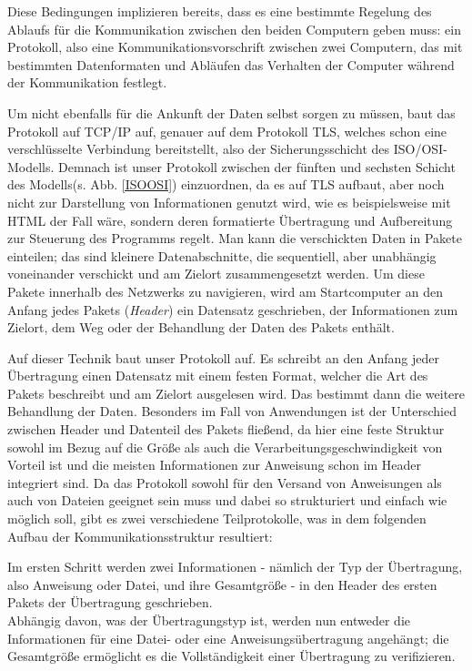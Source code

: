 Diese Bedingungen implizieren bereits, dass es eine bestimmte Regelung des Ablaufs für die Kommunikation zwischen den beiden Computern geben muss: ein Protokoll, also eine Kommunikationsvorschrift zwischen zwei Computern, das mit bestimmten Datenformaten und Abläufen das Verhalten der Computer während der Kommunikation festlegt.\par
Um nicht ebenfalls für die Ankunft der Daten selbst sorgen zu müssen, baut das Protokoll auf TCP/IP auf, genauer auf dem Protokoll TLS, welches schon eine verschlüsselte Verbindung bereitstellt, also der Sicherungsschicht des ISO/OSI-Modells. 
Demnach ist unser Protokoll zwischen der fünften und sechsten Schicht des Modells(s. Abb. \ref{ISOOSI}) einzuordnen, da es auf TLS aufbaut, aber noch nicht zur Darstellung von Informationen genutzt wird, wie es beispielsweise mit HTML der Fall wäre, sondern deren formatierte Übertragung und Aufbereitung zur Steuerung des Programms regelt.
Man kann die verschickten Daten in Pakete einteilen; das sind kleinere Datenabschnitte, die sequentiell, aber unabhängig voneinander verschickt und am Zielort zusammengesetzt werden.
Um diese Pakete innerhalb des Netzwerks zu navigieren, wird am Startcomputer an den Anfang jedes Pakets (\textit{Header}) ein Datensatz geschrieben, der Informationen zum Zielort, dem Weg oder der Behandlung der Daten des Pakets enthält.\\\par
Auf dieser Technik baut unser Protokoll auf. Es schreibt an den Anfang jeder Übertragung einen Datensatz mit einem festen Format, welcher die Art des Pakets beschreibt und am Zielort ausgelesen wird. Das bestimmt dann die weitere Behandlung der Daten.
Besonders im Fall von Anwendungen ist der Unterschied zwischen Header und Datenteil des Pakets fließend, da hier eine feste Struktur sowohl im Bezug auf die Größe als auch die Verarbeitungsgeschwindigkeit von Vorteil ist und die meisten Informationen zur Anweisung schon im Header integriert sind.
Da das Protokoll sowohl für den Versand von Anweisungen als auch von Dateien geeignet sein muss und dabei so strukturiert und einfach wie möglich soll, gibt es zwei verschiedene Teilprotokolle, was in dem folgenden Aufbau der Kommunikationsstruktur resultiert:\par
Im ersten Schritt werden zwei Informationen - nämlich der Typ der Übertragung, also Anweisung oder Datei, und ihre Gesamtgröße - in den Header des ersten Pakets der Übertragung geschrieben.\\
Abhängig davon, was der Übertragungstyp ist, werden nun entweder die Informationen für eine Datei- oder eine Anweisungsübertragung angehängt; die Gesamtgröße ermöglicht es die Vollständigkeit einer Übertragung zu verifizieren.
